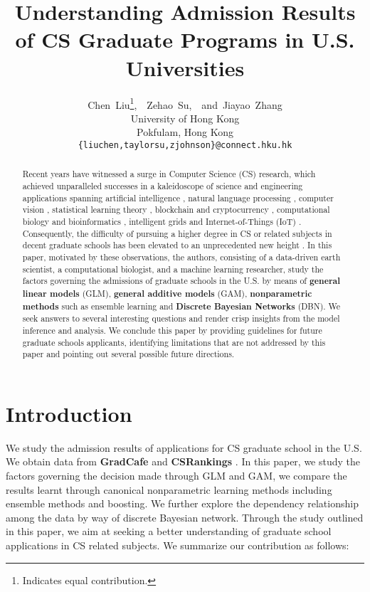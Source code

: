 \documentclass{article}
\title{Understanding Admission Results of CS Graduate Programs in U.S. Universities}
\author{
    Chen~Liu\thanks{Indicates equal contribution.},~~Zehao~Su\samethanks{},~~and~Jiayao~Zhang\samethanks{}\\
    University of Hong Kong\\
    Pokfulam, Hong Kong\\
    \texttt{\{liuchen,taylorsu,zjohnson\}@connect.hku.hk}\\
}
\newcommand{\noun}[1]{\textbf{#1}}
\begin{document}
\maketitle

\begin{abstract}
    Recent years have witnessed a surge in Computer Science (CS) research, which achieved unparalleled
    successes in a kaleidoscope of science and engineering applications spanning
    artificial intelligence \cite{Silver:2016:Go}, natural language processing \cite{Manning:2014:NLP}, computer vision \cite{Alex:2012:AlexNet},
    statistical learning theory \cite{LeCun:2015:DL}, blockchain and cryptocurrency \cite{Bonneau:2015:SOK},
    computational biology \cite{Cock:2009:BioPy} and bioinformatics \cite{Saeys:2007:Bio},
    intelligent grids and Internet-of-Things (IoT) \cite{Atzori:2010:IOT}. Consequently,
    the difficulty of pursuing a higher degree in CS or related subjects in decent graduate
    schools has been elevated to an unprecedented new height \cite{Rag:2010:GRAD}. In this paper, motivated
    by these observations, the authors, consisting of a data-driven earth scientist, a computational biologist,
     and a machine learning researcher, study the factors governing the
    admissions of graduate schools in the U.S. by means of \noun{general linear models} (GLM),
    \noun{general additive models} (GAM), \noun{nonparametric methods} such as ensemble learning and
    \noun{Discrete Bayesian Networks} (DBN).
    We seek answers to several interesting questions and
    render crisp insights from the model inference and analysis.
    We conclude this paper by providing guidelines for future graduate schools
    applicants, identifying limitations that are not addressed by this paper
    and pointing out several possible future directions.
\end{abstract}

\section{Introduction}

We study the admission results of applications for CS graduate school in the U.S. We obtain data from \noun{GradCafe} \cite{GradCafe} and
\noun{CSRankings} \cite{CSR}. In this paper, we study the factors governing the decision made through GLM and GAM, we compare the results
learnt through canonical nonparametric learning methods including ensemble methods and boosting. We further explore the dependency relationship
among the data by way of discrete Bayesian network.
Through the study outlined in this paper, we aim at seeking a better understanding of graduate school applications in CS related subjects. We summarize our contribution as follows:
\end{document}
